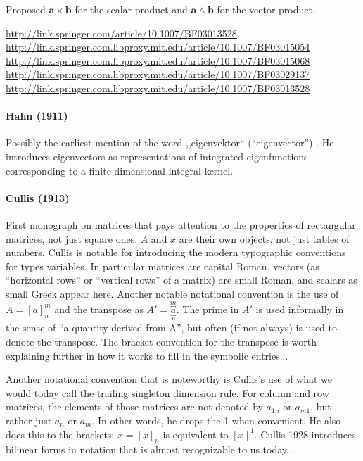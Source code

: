 Proposed $\mathbf{a}\times\mathbf{b}$ for the scalar product and  $\mathbf{a}\wedge\mathbf{b}$ for the vector product.

\url{http://link.springer.com/article/10.1007/BF03013528}
\url{http://link.springer.com.libproxy.mit.edu/article/10.1007/BF03015054}
\url{http://link.springer.com.libproxy.mit.edu/article/10.1007/BF03015068}
\url{http://link.springer.com.libproxy.mit.edu/article/10.1007/BF03029137}
\url{http://link.springer.com.libproxy.mit.edu/article/10.1007/BF03013528}


\paragraph{Hahn (1911)~\cite{Hahn1911}}

Possibly the earliest mention of the word ,,eigenvektor`` (``eigenvector'') \cite[p. 35]{Hahn1911}.
He introduces eigenvectors as representations of integrated eigenfunctions corresponding to a finite-dimensional integral kernel.



\paragraph{Cullis (1913)}

First monograph on matrices that pays attention to the properties of
rectangular matrices, not just square ones. $A$ and $x$ are their own objects,
not just tables of numbers.
Cullis is notable for introducing the modern typographic conventions for types
variables. In particular matrices are capital Roman, vectors (as ``horizontal
rows'' or ``vertical rows'' of a matrix) are small Roman, and scalars as small
Greek appear here.  Another notable notational convention is the use of $A =
{[a]}^m_n$ and the transpose as $A' = \overbracket{\underbracket{a}}^m_n$. The
prime in $A'$ is used informally in the sense of ``a quantity derived from A'',
but often (if not always) is used to denote the transpose.
The bracket convention for the transpose is worth explaining further in how it
works to fill in the symbolic entries...

Another notational convention that is noteworthy is Cullis's use of what we
would today call the trailing singleton dimension rule. For column and row
matrices, the elements of those matrices are not denoted by $a_{1n}$ or
$a_{m1}$, but rather just $a_n$ or $a_m$. In other words, he drops the 1 when
convenient. He also does this to the brackets: $x = {[x]}_n$ is equivalent to
${[x]}^1$.
Cullis 1928 introduces bilinear forms in notation that is almost recognizable to us today...



